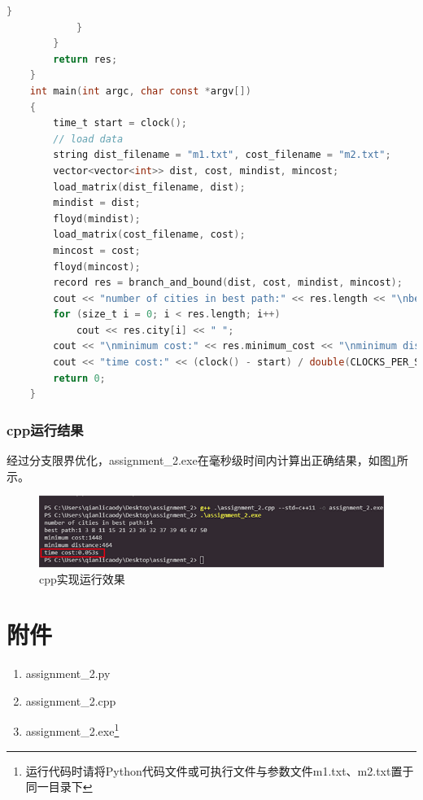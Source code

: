 \documentclass[a4paper,12pt]{article}
\begin{document}
\begin{lstlisting}[language=C]
                }
            }
        }
        return res;
    }
    int main(int argc, char const *argv[])
    {
        time_t start = clock();
        // load data
        string dist_filename = "m1.txt", cost_filename = "m2.txt";
        vector<vector<int>> dist, cost, mindist, mincost;
        load_matrix(dist_filename, dist);
        mindist = dist;
        floyd(mindist);
        load_matrix(cost_filename, cost);
        mincost = cost;
        floyd(mincost);
        record res = branch_and_bound(dist, cost, mindist, mincost);
        cout << "number of cities in best path:" << res.length << "\nbest path:";
        for (size_t i = 0; i < res.length; i++)
            cout << res.city[i] << " ";
        cout << "\nminimum cost:" << res.minimum_cost << "\nminimum distance:" << res.minimum_dist << endl;
        cout << "time cost:" << (clock() - start) / double(CLOCKS_PER_SEC) << "s" << endl;
        return 0;
    }
\end{lstlisting}
\subsubsection{cpp运行结果}
经过分支限界优化，assignment\_2.exe在毫秒级时间内计算出正确结果，如图\ref{fig-cpp-result}所示。
\begin{figure}[htbp]
    \includegraphics{./src/cpp_result.png}
    \caption{cpp实现运行效果}
    \label{fig-cpp-result}
\end{figure}
\section{附件}
\begin{enumerate}
    \item assignment\_2.py
    \item assignment\_2.cpp
    \item assignment\_2.exe\footnote{运行代码时请将Python代码文件或可执行文件与参数文件m1.txt、m2.txt置于同一目录下}
\end{enumerate}
\end{document}
